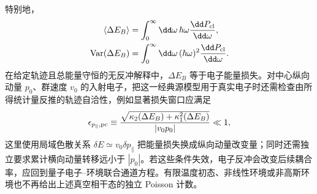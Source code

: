 特别地，
\begin{align}
 \langle\Delta E_B\rangle
 &=\int_0^\infty\dd\omega\,\hbar\omega
 \frac{\dd P_{\rm cl}}{\dd\omega},\\
 \operatorname{Var}(\Delta E_B)
 &=\int_0^\infty\dd\omega\,(\hbar\omega)^2
 \frac{\dd P_{\rm cl}}{\dd\omega}.
 \label{eq:green-loss-mean-variance-dp84}
\end{align}
在给定轨迹且总能量守恒的无反冲解释中，$\Delta E_B$ 等于电子能量损失。对中心纵向动量 $p_0$、群速度 $v_0$ 的入射电子，把这一经典源模型用于真实电子时还需检查由所得统计量反推的轨迹自洽性，例如显著损失窗口应满足
\begin{equation}
 {
 \epsilon_{p_\parallel,\rm pc}
 \equiv
 \frac{\sqrt{\kappa_2(\Delta E_B)+\kappa_1^2(\Delta E_B)}}{|v_0p_0|}
 \ll1,}
 \label{eq:prescribed-current-energy-selfconsistency-dp85}
\end{equation}
这里使用局域色散关系 $\delta E\simeq v_0\delta p_\parallel$ 把能量损失换成纵向动量改变量；同时还需独立要求累计横向动量转移远小于 $|p_0|$。若这些条件失效，电子反冲会改变后续耦合率，应回到量子电子--环境联合通道方程。有限温度初态、非线性环境或非高斯环境也不再给出上述真空相干态的独立 Poisson 计数。
